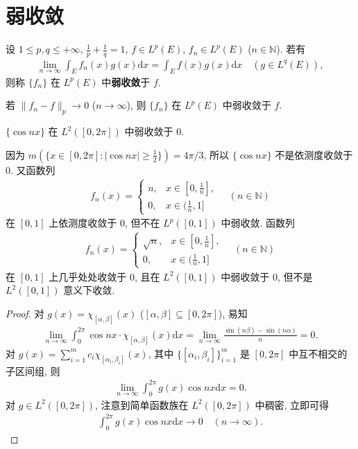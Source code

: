 \documentclass[../../main.tex]{subfiles}%
\begin{document}
\section{弱收敛}

\begin{definition}[弱收敛]
设 $1\leqslant p,q\leqslant +\infty$, $\frac{1}{p}+\frac{1}{q}=1$, $f\in L^p(E)$, $f_n\in L^p(E)$ ($n\in\mathbb{N}$). 若有
\begin{align*}
\lim_{n\to\infty}\int_E f_n(x)g(x)\mathrm{d}x=\int_E f(x)g(x)\mathrm{d}x\quad (g\in L^q(E)),
\end{align*}
则称 $\{f_n\}$ 在 $L^p(E)$ 中\textbf{弱收敛}于 $f$.
\end{definition}
\begin{remark}
若 $\|f_n-f\|_p\to 0$ ($n\to\infty$), 则 $\{f_n\}$ 在 $L^p(E)$ 中弱收敛于 $f$.
\end{remark}

\begin{example}
$\{\cos nx\}$ 在 $L^2([0,2\pi])$ 中弱收敛于 $0$.
\end{example}
\begin{remark}
因为 $m(\{x\in[0,2\pi]:|\cos nx|\geqslant \frac{1}{2}\})=4\pi/3$, 所以 $\{\cos nx\}$ 不是依测度收敛于 $0$. 又函数列
\begin{align*}
f_n(x)=
\begin{cases}
n, & x\in[0,\frac{1}{n}], \\
0, & x\in(\frac{1}{n},1]
\end{cases}
\quad (n\in\mathbb{N})
\end{align*}
在 $[0,1]$ 上依测度收敛于 $0$, 但不在 $L^p([0,1])$ 中弱收敛. 函数列
\begin{align*}
f_n(x)=
\begin{cases}
\sqrt{n}, & x\in[0,\frac{1}{n}], \\
0, & x\in(\frac{1}{n},1]
\end{cases}
\quad (n\in\mathbb{N})
\end{align*}
在 $[0,1]$ 上几乎处处收敛于 $0$, 且在 $L^2([0,1])$ 中弱收敛于 $0$, 但不是 $L^2([0,1])$ 意义下收敛.
\end{remark}
\begin{proof}
对 $g(x)=\chi_{[\alpha,\beta]}(x)$ ($[\alpha,\beta]\subseteq[0,2\pi]$), 易知
\begin{align*}
\lim_{n\to\infty}\int_0^{2\pi}\cos nx\cdot\chi_{[\alpha,\beta]}(x)\mathrm{d}x=\lim_{n\to\infty}\frac{\sin(n\beta)-\sin(n\alpha)}{n}=0.
\end{align*}
对 $g(x)=\sum_{i=1}^m c_i\chi_{[\alpha_i,\beta_i]}(x)$, 其中 $\{[\alpha_i,\beta_i]\}_{i=1}^m$ 是 $[0,2\pi]$ 中互不相交的子区间组, 则
\begin{align*}
\lim_{n\to\infty}\int_0^{2\pi}g(x)\cos nx\mathrm{d}x=0.
\end{align*}
对 $g\in L^2([0,2\pi])$, 注意到简单函数族在 $L^2([0,2\pi])$ 中稠密, 立即可得
\begin{align*}
\int_0^{2\pi}g(x)\cos nx\mathrm{d}x\to 0\quad (n\to\infty).
\end{align*}
\end{proof}
\end{document}
